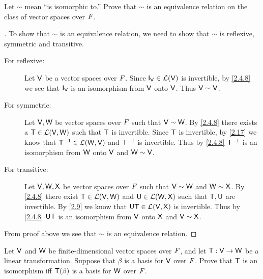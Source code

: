 \setcounter{ex}{12}
\begin{ex}\label{ex:2.4.13}
  Let \(\sim\) mean ``is isomorphic to.''
  Prove that \(\sim\) is an equivalence relation on the class of vector spaces over \(\mathit{F}\).
\end{ex}

\begin{proof}[]
  To show that \(\sim\) is an equivalence relation, we need to show that \(\sim\) is reflexive, symmetric and transitive.
  \begin{description}
    \item[For reflexive:]
      Let \(\mathsf{V}\) be a vector spaces over \(\mathit{F}\).
      Since \(\IT[\V] \in \ls(\V)\) is invertible, by \cref{2.4.8} we see that \(\IT[\V]\) is an isomorphism from \(\mathsf{V}\) onto \(\mathsf{V}\).
      Thus \(\mathsf{V} \sim \mathsf{V}\).
    \item[For symmetric:]
      Let \(\mathsf{V}, \mathsf{W}\) be vector spaces over \(\mathit{F}\) such that \(\mathsf{V} \sim \mathsf{W}\).
      By \cref{2.4.8} there exists a \(\mathsf{T} \in \mathcal{L}(\mathsf{V}, \mathsf{W})\) such that \(\mathsf{T}\) is invertible.
      Since \(\mathsf{T}\) is invertible, by \cref{2.17} we know that \(\mathsf{T}^{-1} \in \mathcal{L}(\mathsf{W}, \mathsf{V})\) and \(\mathsf{T}^{-1}\) is invertible.
      Thus by \cref{2.4.8} \(\mathsf{T}^{-1}\) is an isomorphism from \(\mathsf{W}\) onto \(\mathsf{V}\) and \(\mathsf{W} \sim \mathsf{V}\).
    \item[For transitive:]
      Let \(\mathsf{V}, \mathsf{W}, \mathsf{X}\) be vector spaces over \(\mathit{F}\) such that \(\mathsf{V} \sim \mathsf{W}\) and \(\mathsf{W} \sim \mathsf{X}\).
      By \cref{2.4.8} there exist \(\mathsf{T} \in \mathcal{L}(\mathsf{V}, \mathsf{W})\) and \(\mathsf{U} \in \mathcal{L}(\mathsf{W}, \mathsf{X})\) such that \(\mathsf{T}, \mathsf{U}\) are invertible.
      By \cref{2.9} we know that \(\mathsf{U} \mathsf{T} \in \mathcal{L}(\mathsf{V}, \mathsf{X})\) is invertible.
      Thus by \cref{2.4.8} \(\mathsf{U} \mathsf{T}\) is an isomorphism from \(\mathsf{V}\) onto \(\mathsf{X}\) and \(\mathsf{V} \sim \mathsf{X}\).
  \end{description}
  From proof above we see that \(\sim\) is an equivalence relation.
\end{proof}

\setcounter{ex}{14}
\begin{ex}\label{ex:2.4.15}
  Let \(\mathsf{V}\) and \(\mathsf{W}\) be finite-dimensional vector spaces over \(\mathit{F}\), and let \(\mathsf{T} : \mathsf{V} \to \mathsf{W}\) be a linear transformation.
  Suppose that \(\beta\) is a basis for \(\mathsf{V}\) over \(\mathit{F}\).
  Prove that \(\mathsf{T}\) is an isomorphism iff \(\mathsf{T}(\beta)\) is a basis for \(\mathsf{W}\) over \(\mathit{F}\).
\end{ex}

